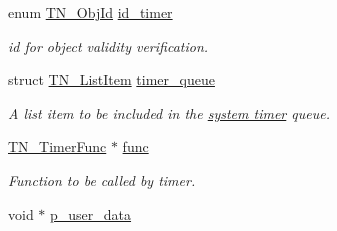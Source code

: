 \begin{DoxyCompactItemize}
\item 
enum \hyperlink{tn__common_8h_ae779dd1f6735f6e139fb70acd004d976}{T\+N\+\_\+\+Obj\+Id} \hyperlink{structTN__Timer_a27482d3470455064da95b9453ae87156}{id\+\_\+timer}
\begin{DoxyCompactList}\small\item\em id for object validity verification. \end{DoxyCompactList}\item 
\hypertarget{structTN__Timer_a9418f1d84fa83d87197f3457ddb74e27}{struct \hyperlink{structTN__ListItem}{T\+N\+\_\+\+List\+Item} \hyperlink{structTN__Timer_a9418f1d84fa83d87197f3457ddb74e27}{timer\+\_\+queue}}\label{structTN__Timer_a9418f1d84fa83d87197f3457ddb74e27}

\begin{DoxyCompactList}\small\item\em A list item to be included in the {\itshape \hyperlink{time_ticks}{system timer}} queue. \end{DoxyCompactList}\item 
\hypertarget{structTN__Timer_a154ff9bb98135481b1874bdd8d6f2b9c}{\hyperlink{tn__timer_8h_a98be38210cd5a636dc4170e087ea0e67}{T\+N\+\_\+\+Timer\+Func} $\ast$ \hyperlink{structTN__Timer_a154ff9bb98135481b1874bdd8d6f2b9c}{func}}\label{structTN__Timer_a154ff9bb98135481b1874bdd8d6f2b9c}

\begin{DoxyCompactList}\small\item\em Function to be called by timer. \end{DoxyCompactList}\item 
\hypertarget{structTN__Timer_aaf753d5fb1001702f07379b2ed7ac177}{void $\ast$ \hyperlink{structTN__Timer_aaf753d5fb1001702f07379b2ed7ac177}{p\+\_\+user\+\_\+data}}\label{structTN__Timer_aaf753d5fb1001702f07379b2ed7ac177}


\end{DoxyCompactItemize}
